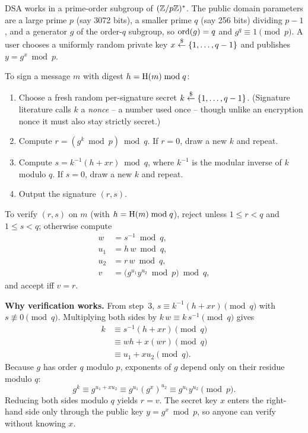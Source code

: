 DSA works in a prime-order subgroup of $(\mathbb{Z}/p\mathbb{Z})^{*}$. The public domain parameters are a large prime $p$ (say 3072 bits), a smaller prime $q$ (say 256 bits) dividing $p-1$, and a generator $g$ of the order-$q$ subgroup, so $\operatorname{ord}(g) = q$ and $g^q \equiv 1 \pmod p$. A user chooses a uniformly random private key $x \stackrel{\$}{\gets} \{1,\dots,q-1\}$ and publishes $y = g^{x} \bmod p$.

To sign a message $m$ with digest $h = \operatorname{H}(m) \bmod q$:
\begin{enumerate}
  \item Choose a fresh random per-signature secret $k \stackrel{\$}{\gets} \{1, \dots, q-1\}$. (Signature literature calls $k$ a \emph{nonce} -- a number used once -- though unlike an encryption nonce it must also stay strictly secret.)
  \item Compute $r = (g^{k} \bmod p) \bmod q$. If $r = 0$, draw a new $k$ and repeat.
  \item Compute $s = k^{-1}(h + x r) \bmod q$, where $k^{-1}$ is the modular inverse of $k$ modulo $q$. If $s = 0$, draw a new $k$ and repeat.
  \item Output the signature $(r, s)$.
\end{enumerate}

To verify $(r,s)$ on $m$ (with $h = \operatorname{H}(m) \bmod q$), reject unless $1 \le r < q$ and $1 \le s < q$; otherwise compute
\begin{align*}
  w &= s^{-1} \bmod q, \\
  u_1 &= h\,w \bmod q, \\
  u_2 &= r\,w \bmod q, \\
  v &= \bigl(g^{u_1} y^{u_2} \bmod p\bigr) \bmod q,
\end{align*}
and accept iff $v = r$.

\begin{whybox}
\textbf{Why verification works.} From step~3, $s \equiv k^{-1}(h + xr) \pmod q$ with $s \not\equiv 0 \pmod q$. Multiplying both sides by $k\,w \equiv k\,s^{-1} \pmod q$ gives
\begin{align*}
  k &\equiv s^{-1}(h + x r) \pmod q \\
    &\equiv w h + x (w r) \pmod q \\
    &\equiv u_1 + x u_2 \pmod q.
\end{align*}
Because $g$ has order $q$ modulo $p$, exponents of $g$ depend only on their residue modulo $q$:
\[
  g^{k} \equiv g^{u_1 + x u_2} \equiv g^{u_1}(g^{x})^{u_2} \equiv g^{u_1} y^{u_2} \pmod p.
\]
Reducing both sides modulo $q$ yields $r = v$. The secret key $x$ enters the right-hand side only through the public key $y = g^x \bmod p$, so anyone can verify without knowing $x$.
\end{whybox}

